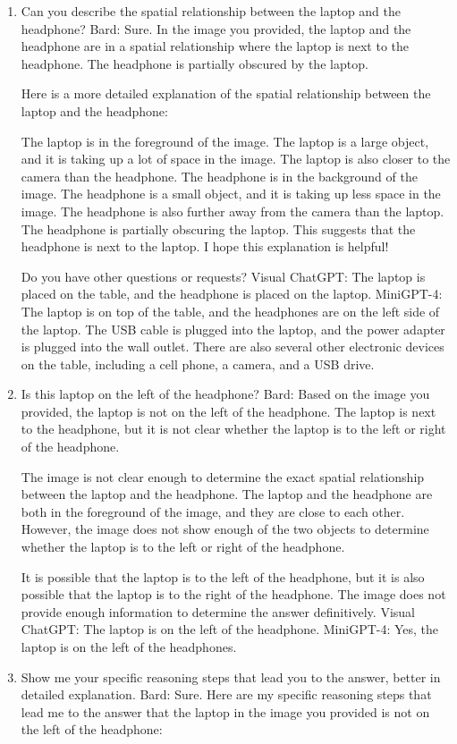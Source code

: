 \begin{enumerate}
    \item Can you describe the spatial relationship between the laptop and the headphone?
    \subitem Bard: 
    Sure. In the image you provided, the laptop and the headphone are in a spatial relationship where the laptop is next to the headphone. The headphone is partially obscured by the laptop.

    Here is a more detailed explanation of the spatial relationship between the laptop and the headphone:

    The laptop is in the foreground of the image. The laptop is a large object, and it is taking up a lot of space in the image. The laptop is also closer to the camera than the headphone.
    The headphone is in the background of the image. The headphone is a small object, and it is taking up less space in the image. The headphone is also further away from the camera than the laptop.
    The headphone is partially obscuring the laptop. This suggests that the headphone is next to the laptop.
    I hope this explanation is helpful!

    Do you have other questions or requests?
    \subitem Visual ChatGPT: The laptop is placed on the table, and the headphone is placed on the laptop.
    \subitem MiniGPT-4: The laptop is on top of the table, and the headphones are on the left side of the laptop. The USB cable is plugged into the laptop, and the power adapter is plugged into the wall outlet. There are also several other electronic devices on the table, including a cell phone, a camera, and a USB drive.
    \item Is this laptop on the left of the headphone?
    \subitem Bard: 
    Based on the image you provided, the laptop is not on the left of the headphone. The laptop is next to the headphone, but it is not clear whether the laptop is to the left or right of the headphone.
    
    The image is not clear enough to determine the exact spatial relationship between the laptop and the headphone. The laptop and the headphone are both in the foreground of the image, and they are close to each other. However, the image does not show enough of the two objects to determine whether the laptop is to the left or right of the headphone.
    
    It is possible that the laptop is to the left of the headphone, but it is also possible that the laptop is to the right of the headphone. The image does not provide enough information to determine the answer definitively.
    \subitem Visual ChatGPT: The laptop is on the left of the headphone.
    \subitem MiniGPT-4: Yes, the laptop is on the left of the headphones.
    \item Show me your specific reasoning steps that lead you to the answer, better in detailed explanation.
    \subitem Bard: 
    Sure. Here are my specific reasoning steps that lead me to the answer that the laptop in the image you provided is not on the left of the headphone:
    

\end{enumerate}
